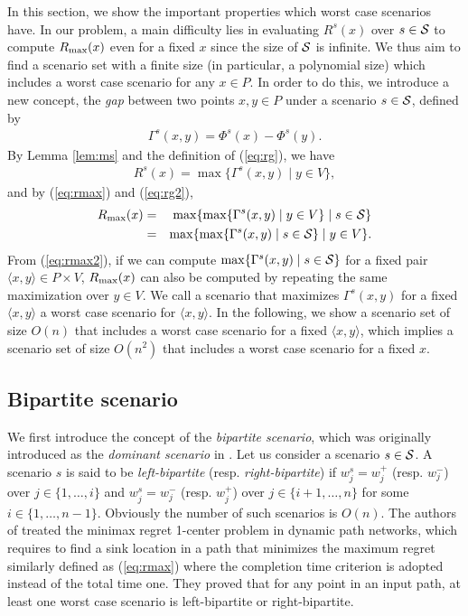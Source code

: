 \documentclass[a4paper]{llncs}
\begin{document}
In this section, we show the important properties which worst case scenarios have.
In our problem, a main difficulty lies in evaluating $R^s(x)$ over $s \in {\cal S}$ to compute $R_{\rm max}(x)$ even for a fixed $x$ since 
the size of ${\cal S}$ is infinite.
We thus aim to find a scenario set with a finite size (in particular, a polynomial size)
which includes a worst case scenario for any $x \in P$.
In order to do this, we introduce a new concept, the {\it gap} between two points $x, y \in P$ under a scenario $s \in {\cal S}$, defined by
\begin{eqnarray}
\Gamma^s(x, y) = \Phi^s(x) - \Phi^s(y).
\label{eq:gap}
\end{eqnarray}
By Lemma \ref{lem:ms} and the definition of (\ref{eq:rg}), we have
\begin{eqnarray}
R^s(x) = \max \{ \Gamma^s(x, y) \mid y \in V \}, 
\label{eq:rg2}
\end{eqnarray}
and by (\ref{eq:rmax}) and (\ref{eq:rg2}),
\begin{eqnarray}
R_{\rm max}(x)	&=& \max \{ \max \{\Gamma^s(x, y) \mid y \in V \} \mid s \in {\cal S} \} \notag \\
			&=& \max \{ \max \{\Gamma^s(x, y) \mid s \in {\cal S} \} \mid y \in V \}.
\label{eq:rmax2}
\end{eqnarray}
From (\ref{eq:rmax2}), if we can compute $\max \{\Gamma^s(x, y) \mid s \in {\cal S} \}$ for a fixed pair $\langle x, y \rangle \in P \times V$,
$R_{\rm max}(x)$ can also be computed by repeating the same maximization over $y \in V$.
We call a scenario that maximizes $\Gamma^s(x, y)$ for a fixed $\langle x, y \rangle$ a worst case scenario for $\langle x, y \rangle$.
In the following, we show a scenario set of size $O(n)$ that includes a worst case scenario for a fixed $\langle x, y \rangle$,
which implies a scenario set of size $O(n^2)$ that includes a worst case scenario for a fixed $x$. 


\subsection{Bipartite scenario}
\label{subsec:bs}
We first introduce the concept of the {\it bipartite scenario}, which was originally introduced as the {\it dominant scenario} in \cite{chknsx13,hacknsx14}.
Let us consider a scenario $s \in {\cal S}$.
A scenario $s$ is said to be {\it left-bipartite} (resp. {\it right-bipartite})
if $w^s_j = w^+_j$ (resp. $w^-_j$) over $j \in \{1, \ldots, i\}$ and 
$w^s_j = w^-_j$ (resp. $w^+_j$) over $j \in \{i+1, \ldots, n\}$ for some $i \in \{1, \ldots, n-1\}$.
Obviously the number of such scenarios is $O(n)$.
The authors of \cite{chknsx13,hacknsx14} treated the minimax regret 1-center problem in dynamic path networks,
which requires to find a sink location in a path that minimizes the maximum regret similarly defined as (\ref{eq:rmax})
where the completion time criterion is adopted instead of the total time one.
They proved that for any point in an input path, at least one worst case scenario is left-bipartite or right-bipartite.
\end{document}

